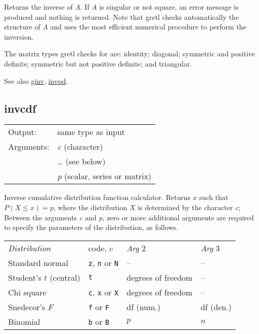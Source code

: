 	  Returns the inverse of \textsl{A}. If
	  \textsl{A} is singular or not square, an error message
	  is produced and nothing is returned. Note that gretl checks
	  automatically the structure of \textsl{A} and uses the
	  most efficient numerical procedure to perform the inversion.

	  The matrix types gretl checks for are: identity; diagonal;
	  symmetric and positive definite; symmetric but not positive
	  definite; and triangular.

	  See also \hyperlink{func-ginv}{ginv}, \hyperlink{func-invpd}{invpd}.

\subsection{invcdf}
\hypertarget{func-invcdf}{}

\begin{tabular}{ll}
Output:     & same type as input\\
Arguments:  & \textsl{c} (character)\\
           & \textsl{\dots{}} (see below)\\
           & \textsl{p} (scalar, series or matrix)\\
\end{tabular}

	  Inverse cumulative distribution function calculator. Returns
	  \ensuremath{x} such that
	  $P(X \le x) = p$, where the distribution \ensuremath{X}
	  is determined by the character \textsl{c}; Between the
	  arguments \textsl{c} and \textsl{p}, zero or
	  more additional arguments are required to specify the parameters
	  of the distribution, as follows.

	  \begin{center} 
	  \begin{tabular}{llll} 
	  \textit{Distribution} & code, $c$ &
	  \textit{Arg} 2 & \textit{Arg} 3 \\[4pt] 
	  Standard normal & \texttt{z}, \texttt{n} or \texttt{N} &
	  -- & -- \\ 
	  Student's $t$ (central) & \texttt{t} & 
	  degrees of freedom & -- \\ 
	  Chi square & \texttt{c}, \texttt{x} or \texttt{X} & 
	  degrees of freedom & -- \\
	  Snedecor's $F$ & \texttt{f} or \texttt{F} & 
	  df (num.) & df (den.) \\ 
	  Binomial & \texttt{b} or \texttt{B} & 
	  $p$ & $n$ \\
	  \end{tabular}
	  \end{center}

